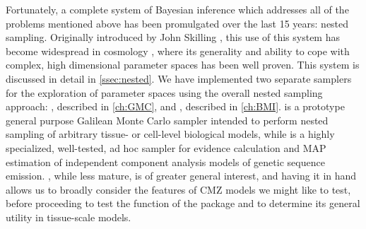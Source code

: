 Fortunately, a complete system of Bayesian inference which addresses all of the problems mentioned above has been promulgated over the last 15 years: nested sampling. Originally introduced by John Skilling \cite{Skilling2006}, this use of this system has become widespread in cosmology \cite{Trotta2008}, where its generality and ability to cope with complex, high dimensional parameter spaces has been well proven. This system is discussed in detail in \autoref{ssec:nested}. We have implemented two separate samplers for the exploration of parameter spaces using the overall nested sampling approach: , described in \autoref{ch:GMC}, and , described in \autoref{ch:BMI}.  is a prototype general purpose Galilean Monte Carlo sampler intended to perform nested sampling of arbitrary tissue- or cell-level biological models, while  is a highly specialized, well-tested, ad hoc sampler for evidence calculation and MAP estimation of independent component analysis models of genetic sequence emission. , while less mature, is of greater general interest, and having it in hand allows us to broadly consider the features of CMZ models we might like to test, before proceeding to test the function of the package and to determine its general utility in tissue-scale models.

